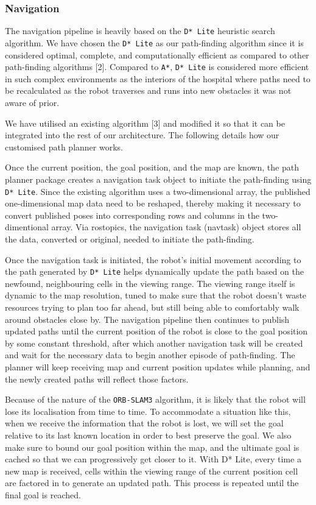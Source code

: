 \documentclass[10pt,english]{article}
\begin{document}
\subsubsection*{Navigation}

The navigation pipeline is heavily based on the \texttt{D* Lite} heuristic search algorithm.
We have chosen the \texttt{D* Lite} as our path-finding algorithm since it is considered optimal, complete, and computationally efficient as compared to other path-finding algorithms [2].
Compared to \texttt{A*}, \texttt{D* Lite} is considered more efficient in such complex environments as the interiors of the hospital where paths need to be recalculated as the robot traverses and runs into new obstacles it was not aware of prior.

We have utilised an existing algorithm [3] and modified it so that it can be integrated into the rest of our architecture. The following details how our customised path planner works.

Once the current position, the goal position, and the map are known, the path planner package creates a navigation task object to initiate the path-finding using \texttt{D* Lite}.
Since the existing algorithm uses a two-dimensional array, the published one-dimensional map data need to be reshaped, thereby making it necessary to convert published poses into corresponding rows and columns in the two-dimentional array. Via rostopics, the navigation task (navtask) object stores all the data, converted or original, needed to initiate the path-finding.

Once the navigation task is initiated, the robot's initial movement according to the path generated by \texttt{D* Lite} helps dynamically update the path based on the newfound, neighbouring cells in the viewing range. The viewing range itself is dynamic to the map resolution, tuned to make sure that the robot doesn't waste resources trying to plan too far ahead, but still being able to comfortably walk around obstacles close by. The navigation pipeline then continues to publish updated paths until the current position of the robot is close to the goal position by some constant threshold, after which another navigation task will be created and wait for the necessary data to begin another episode of path-finding. The planner will keep receiving map and current position updates while planning, and the newly created paths will reflect those factors.

Because of the nature of the \texttt{ORB-SLAM3} algorithm, it is likely that the robot will lose its localisation from time to time. To accommodate a situation like this, when we receive the information that the robot is lost, we will set the goal relative to its last known location in order to best preserve the goal. We also make sure to bound our goal position within the map, and the ultimate goal is cached so that we can progressively get closer to it. With D* Lite, every time a new map is received, cells within the viewing range of the current position cell are factored in to generate an updated path. This process is repeated until the final goal is reached.
\end{document}
